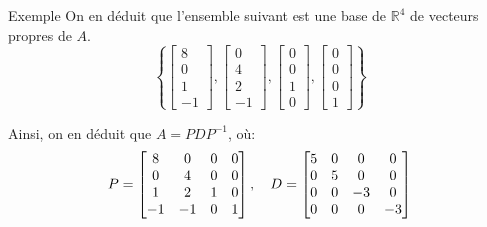 \documentclass[a4paper]{article}
\begin{document}
\begin{parag}{Exemple}
    On en déduit que l'ensemble suivant est une base de $\mathbb{R}^4$ de vecteurs propres de $A$.
    \[\left\{\begin{bmatrix} 8 \\ 0 \\ 1 \\ -1 \end{bmatrix}, \begin{bmatrix} 0 \\ 4 \\ 2 \\ -1 \end{bmatrix}, \begin{bmatrix} 0 \\ 0 \\ 1 \\ 0 \end{bmatrix}, \begin{bmatrix} 0 \\ 0 \\ 0 \\ 1 \end{bmatrix} \right\}\]

    Ainsi, on en déduit que $A = PDP^{-1}$, où:
    \[P = \begin{bmatrix} 8 & 0 & 0 & 0 \\ 0 & 4 & 0 & 0 \\ 1 & 2 & 1 & 0 \\ -1 & -1 & 0 & 1 \end{bmatrix}, \quad D = \begin{bmatrix} 5 & 0 & 0 & 0 \\ 0 & 5 & 0 & 0 \\ 0 & 0 & -3 & 0 \\ 0 & 0 & 0 & -3 \end{bmatrix} \]
\end{parag}
\end{document}
